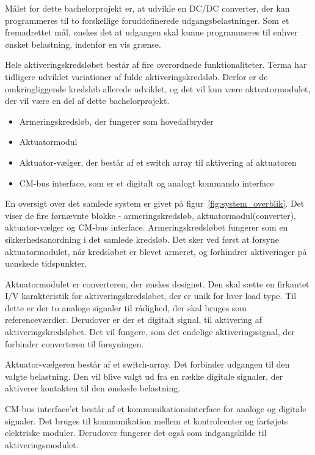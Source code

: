 Målet for dette bachelorprojekt er, at udvikle en DC/DC converter, der kan programmeres til to forskellige foruddefinerede udgangsbelastninger. Som et fremadrettet mål, ønskes det at udgangen skal kunne programmeres til enhver ønsket belastning, indenfor en vis grænse. 

Hele aktiveringskredsløbet består af fire overordnede funktionaliteter. Terma har tidligere udviklet variationer af fulde aktiveringskredsløb. Derfor er de omkringliggende kredsløb allerede udviklet, og det vil kun være aktuatormodulet, der vil være en del af dette bachelorprojekt.
\begin{itemize}
	\item Armeringskredsløb, der fungerer som hovedafbryder
	\item Aktuatormodul
	\item Aktuator-vælger, der består af et switch array til aktivering af aktuatoren
	\item CM-bus interface, som er et digitalt og analogt kommando interface
\end{itemize}

\noindent En oversigt over det samlede system er givet på figur~\ref{fig:system_overblik}. Det viser de fire førnævnte blokke - armeringskredsløb, aktuatormodul(converter), aktuator-vælger og CM-bus interface. Armeringskredsløbet fungerer som en sikkerhedsanordning i det samlede kredsløb. Det sker ved først at forsyne aktuatormodulet, når kredsløbet er blevet armeret, og forhindrer aktiveringer på uønskede tidspunkter. 

Aktuatormodulet er converteren, der ønskes designet. Den skal sætte en firkantet I/V karakteristik for aktiveringskredsløbet, der er unik for hver load type. Til dette er der to analoge signaler til rådighed, der skal bruges som referenceværdier. Derudover er der et digitalt signal, til aktivering af aktiveringskredsløbet. Det vil fungere, som det endelige aktiveringssignal, der forbinder converteren til forsyningen. 

Aktuator-vælgeren består af et switch-array. Det forbinder udgangen til den valgte belastning. Den vil blive valgt ud fra en række digitale signaler, der aktiverer kontakten til den ønskede belastning.

CM-bus interface'et består af et kommunikationsinterface for analoge og digitale signaler. Det bruges til kommunikation mellem et kontrolcenter og fartøjets elektriske moduler. Derudover fungerer det også som indgangskilde til aktiveringsmodulet. 

